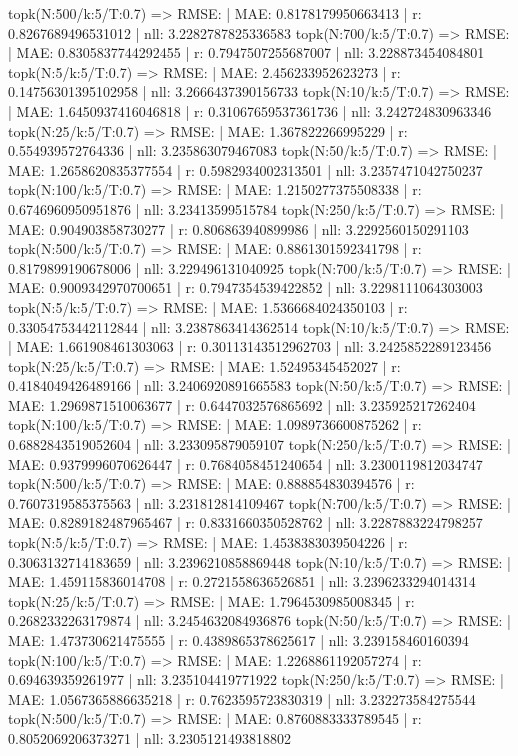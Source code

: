 topk(N:500/k:5/T:0.7) => RMSE: | MAE: 0.8178179950663413 | r: 0.8267689496531012 | nll: 3.2282787825336583
topk(N:700/k:5/T:0.7) => RMSE: | MAE: 0.8305837744292455 | r: 0.7947507255687007 | nll: 3.228873454084801
topk(N:5/k:5/T:0.7) => RMSE: | MAE: 2.456233952623273 | r: 0.14756301395102958 | nll: 3.2666437390156733
topk(N:10/k:5/T:0.7) => RMSE: | MAE: 1.6450937416046818 | r: 0.31067659537361736 | nll: 3.242724830963346
topk(N:25/k:5/T:0.7) => RMSE: | MAE: 1.367822266995229 | r: 0.554939572764336 | nll: 3.235863079467083
topk(N:50/k:5/T:0.7) => RMSE: | MAE: 1.2658620835377554 | r: 0.5982934002313501 | nll: 3.2357471042750237
topk(N:100/k:5/T:0.7) => RMSE: | MAE: 1.2150277375508338 | r: 0.6746960950951876 | nll: 3.23413599515784
topk(N:250/k:5/T:0.7) => RMSE: | MAE: 0.904903858730277 | r: 0.806863940899986 | nll: 3.2292560150291103
topk(N:500/k:5/T:0.7) => RMSE: | MAE: 0.8861301592341798 | r: 0.8179899190678006 | nll: 3.229496131040925
topk(N:700/k:5/T:0.7) => RMSE: | MAE: 0.9009342970700651 | r: 0.7947354539422852 | nll: 3.2298111064303003
topk(N:5/k:5/T:0.7) => RMSE: | MAE: 1.5366684024350103 | r: 0.33054753442112844 | nll: 3.2387863414362514
topk(N:10/k:5/T:0.7) => RMSE: | MAE: 1.661908461303063 | r: 0.30113143512962703 | nll: 3.2425852289123456
topk(N:25/k:5/T:0.7) => RMSE: | MAE: 1.52495345452027 | r: 0.4184049426489166 | nll: 3.2406920891665583
topk(N:50/k:5/T:0.7) => RMSE: | MAE: 1.2969871510063677 | r: 0.6447032576865692 | nll: 3.235925217262404
topk(N:100/k:5/T:0.7) => RMSE: | MAE: 1.0989736600875262 | r: 0.6882843519052604 | nll: 3.233095879059107
topk(N:250/k:5/T:0.7) => RMSE: | MAE: 0.9379996070626447 | r: 0.7684058451240654 | nll: 3.2300119812034747
topk(N:500/k:5/T:0.7) => RMSE: | MAE: 0.888854830394576 | r: 0.7607319585375563 | nll: 3.231812814109467
topk(N:700/k:5/T:0.7) => RMSE: | MAE: 0.8289182487965467 | r: 0.8331660350528762 | nll: 3.2287883224798257
topk(N:5/k:5/T:0.7) => RMSE: | MAE: 1.4538383039504226 | r: 0.3063132714183659 | nll: 3.2396210858869448
topk(N:10/k:5/T:0.7) => RMSE: | MAE: 1.459115836014708 | r: 0.2721558636526851 | nll: 3.2396233294014314
topk(N:25/k:5/T:0.7) => RMSE: | MAE: 1.7964530985008345 | r: 0.2682332263179874 | nll: 3.2454632084936876
topk(N:50/k:5/T:0.7) => RMSE: | MAE: 1.473730621475555 | r: 0.4389865378625617 | nll: 3.239158460160394
topk(N:100/k:5/T:0.7) => RMSE: | MAE: 1.2268861192057274 | r: 0.694639359261977 | nll: 3.235104419771922
topk(N:250/k:5/T:0.7) => RMSE: | MAE: 1.0567365886635218 | r: 0.7623595723830319 | nll: 3.232273584275544
topk(N:500/k:5/T:0.7) => RMSE: | MAE: 0.8760883333789545 | r: 0.8052069206373271 | nll: 3.2305121493818802

